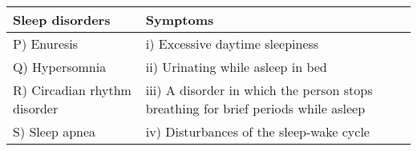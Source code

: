  \begin{tabular}{|l|p{7cm}|}
        \hline
        \textbf{Sleep disorders} & \textbf{Symptoms} \\
        \hline
        P) Enuresis & i) Excessive daytime sleepiness \\
        Q) Hypersomnia & ii) Urinating while asleep in bed \\
        R) Circadian rhythm disorder & iii) A disorder in which the person stops breathing for brief periods while asleep \\
        S) Sleep apnea & iv) Disturbances of the sleep-wake cycle \\
        \hline
    \end{tabular}

